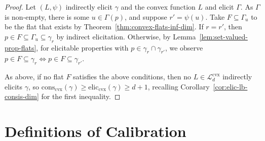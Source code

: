 \documentclass{article} %
\newcommand{\Comments}{0}
\newcommand{\mynote}[2]{\ifnum\Comments=1\textcolor{#1}{#2}\fi}
\newcommand{\mytodo}[2]{\ifnum\Comments=1%
	\todo[linecolor=#1!80!black,backgroundcolor=#1,bordercolor=#1!80!black]{#2}\fi}
\newcommand{\jessie}[1]{\mynote{teal}{[JF: #1]}}
\newcommand{\jessiet}[1]{\mytodo{teal!20!white}{JF: #1}}
\newcommand{\relint}[1]{\mathrm{relint}(#1)}
\newcommand{\prop}[2][\mathcal{P}]{\mathrm{prop}_{#1}[#2]}
\newcommand{\eliccvx}{\mathrm{elic}_\mathrm{cvx}}
\newcommand{\conscvx}{\mathrm{cons}_\mathrm{cvx}}
\newcommand{\range}{\mathrm{range}\,}
\newcommand{\Pcodimension}{$\mathcal{P}$-codimension\,}
\newcommand{\Lcvx}{\mathcal{L}^{\mathrm{cvx}}}
\renewcommand{\P}{\mathcal{P}}
\newcommand{\Y}{\mathcal{Y}}
\newtheorem{lemma}{Lemma}
\begin{document}


\Pcodimflatelicrelintprop*
\begin{proof}
	Let $(L, \psi)$ indirectly elicit $\gamma$ and the convex function $L$ and elicit $\Gamma$.
	As $\Gamma$ is non-empty, there is some $u \in \Gamma(p)$, and suppose $r' = \psi(u)$.
	Take $F \subseteq \Gamma_u$ to be the flat that exists by Theorem~\ref{thm:convex-flats-inf-dim}.
	If $r = r'$, then $p \in F \subseteq \Gamma_u \subseteq \gamma_r$ by indirect elicitation.
	Otherwise, by Lemma~\ref{lem:set-valued-prop-flats}, for elicitable properties with $p \in \gamma_r \cap \gamma_{r'}$, we observe $p \in F\subseteq \gamma_r \iff p \in F \subseteq \gamma_{r'}$.
	
	As above, if no flat $F$ satisfies the above conditions, then no $L\in\Lcvx_d$ indirectly elicits $\gamma$, so $\conscvx(\gamma) \geq \eliccvx(\gamma) \geq d+1$, recalling Corollary~\ref{cor:elic-lb-consis-dim} for the first inequality.
\end{proof}




\section{Definitions of Calibration}\label{app:calibration}
\end{document}
